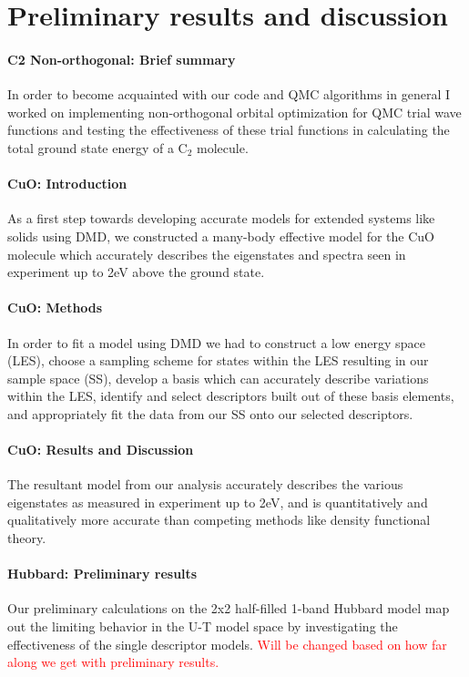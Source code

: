 \documentclass{article}
\begin{document}
\section{Preliminary results and discussion}
\paragraph{C2 Non-orthogonal: Brief summary} In order to become acquainted with our code and QMC algorithms in general I worked on implementing non-orthogonal orbital optimization for QMC trial wave functions and testing the effectiveness of these trial functions in calculating the total ground state energy of a C$_2$ molecule.

\paragraph{CuO: Introduction} As a first step towards developing accurate models for extended systems like solids using DMD, we constructed a many-body effective model for the CuO molecule which accurately describes the eigenstates and spectra seen in experiment up to 2eV above the ground state. 

\paragraph{CuO: Methods} In order to fit a model using DMD we had to construct a low energy space (LES), choose a sampling scheme for states within the LES resulting in our sample space (SS), develop a basis which can accurately describe variations within the LES, identify and select descriptors built out of these basis elements, and appropriately fit the data from our SS onto our selected descriptors. 

\paragraph{CuO: Results and Discussion} The resultant model from our analysis accurately describes the various eigenstates as measured in experiment up to 2eV, and is quantitatively and qualitatively more accurate than competing methods like density functional theory.

\paragraph{Hubbard: Preliminary results} Our preliminary calculations on the 2x2 half-filled 1-band Hubbard model map out the limiting behavior in the U-T model space by investigating the effectiveness of the single descriptor models. \textcolor{red}{Will be changed based on how far along we get with preliminary results.}
\end{document}

